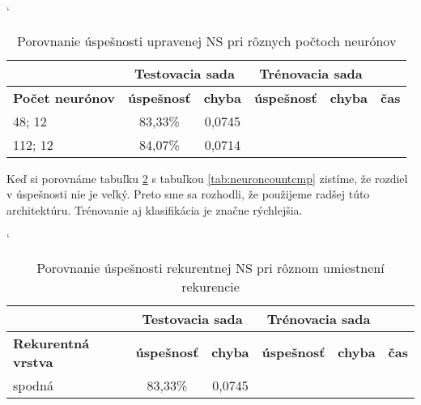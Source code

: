 
\begin{table}[h]
\catcode` %
\centering
\begin{tabular}{|l|c|c|c|c|c|}
\cline{2-5}
\multicolumn{1}{l}{} & \multicolumn{2}{|c|}{\textbf{Testovacia sada}} & \multicolumn{2}{c|}{\textbf{Trénovacia sada}} & \multicolumn{1}{l}{}\\ 
\hline
\textbf{Počet neurónov} & \textbf{úspešnosť} & \textbf{chyba} & \textbf{úspešnosť} & \textbf{chyba} & \textbf{čas} \\ \hline
48; 12 & 83,33\% & 0,0745 & & &\\ \hline
112; 12 & 84,07\% & 0,0714 & & &\\
\hline
\end{tabular}
\caption{Porovnanie úspešnosti upravenej NS pri rôznych počtoch neurónov}
\label{tab:neuroncountcmp2}
\end{table}

{\color{red} Keď si porovnáme tabuľku \ref{tab:neuroncountcmp2} s tabuľkou \ref{tab:neuroncountcmp} zistíme, že rozdiel v úspešnosti nie je veľký. Preto sme sa rozhodli, že použijeme radšej túto architektúru. Trénovanie aj klasifikácia je značne rýchlejšia.}

\todo



\begin{table}[h]
\catcode` %
\centering
\begin{tabular}{|l|c|c|c|c|c|}
\cline{2-5}
\multicolumn{1}{l}{} & \multicolumn{2}{|c|}{\textbf{Testovacia sada}} & \multicolumn{2}{c|}{\textbf{Trénovacia sada}} & \multicolumn{1}{l}{}\\ 
\hline
\textbf{Rekurentná vrstva} & \textbf{úspešnosť} & \textbf{chyba} & \textbf{úspešnosť} & \textbf{chyba} & \textbf{čas} \\ \hline
spodná & 83,33\% & 0,0745 & & &\\ \hline
\end{tabular}
\caption{Porovnanie úspešnosti rekurentnej NS pri rôznom umiestnení rekurencie}
\label{tab:neuroncountcmp2}
\end{table}

